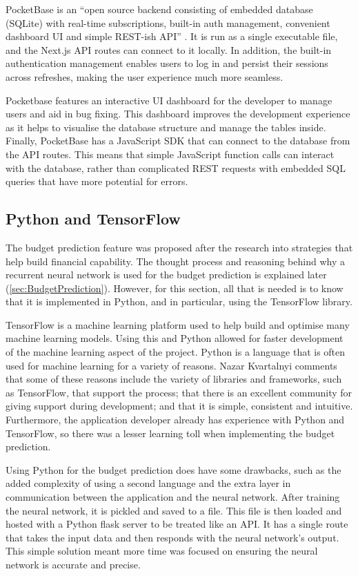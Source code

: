PocketBase is an ``open source backend consisting of embedded database (SQLite) with real-time subscriptions, built-in auth management, convenient dashboard UI and simple REST-ish API'' \cite{PocketBaseDocs}. It is run as a single executable file, and the Next.js API routes can connect to it locally. In addition, the built-in authentication management enables users to log in and persist their sessions across refreshes, making the user experience much more seamless.

Pocketbase features an interactive UI dashboard for the developer to manage users and aid in bug fixing. This dashboard improves the development experience as it helps to visualise the database structure and manage the tables inside. Finally, PocketBase has a JavaScript SDK that can connect to the database from the API routes. This means that simple JavaScript function calls can interact with the database, rather than complicated REST requests with embedded SQL queries that have more potential for errors.

\subsection{Python and TensorFlow}
The budget prediction feature was proposed after the research into strategies that help build financial capability. The thought process and reasoning behind why a recurrent neural network is used for the budget prediction is explained later (\ref{sec:BudgetPrediction}). However, for this section, all that is needed is to know that it is implemented in Python, and in particular, using the TensorFlow library.

TensorFlow is a machine learning platform used to help build and optimise many machine learning models. Using this and Python allowed for faster development of the machine learning aspect of the project. Python is a language that is often used for machine learning for a variety of reasons. Nazar Kvartalnyi \cite{PythonML} comments that some of these reasons include the variety of libraries and frameworks, such as TensorFlow, that support the process; that there is an excellent community for giving support during development; and that it is simple, consistent and intuitive. Furthermore, the application developer already has experience with Python and TensorFlow, so there was a lesser learning toll when implementing the budget prediction.

Using Python for the budget prediction does have some drawbacks, such as the added complexity of using a second language and the extra layer in communication between the application and the neural network. After training the neural network, it is pickled and saved to a file. This file is then loaded and hosted with a Python flask server to be treated like an API. It has a single route that takes the input data and then responds with the neural network's output. This simple solution meant more time was focused on ensuring the neural network is accurate and precise.

